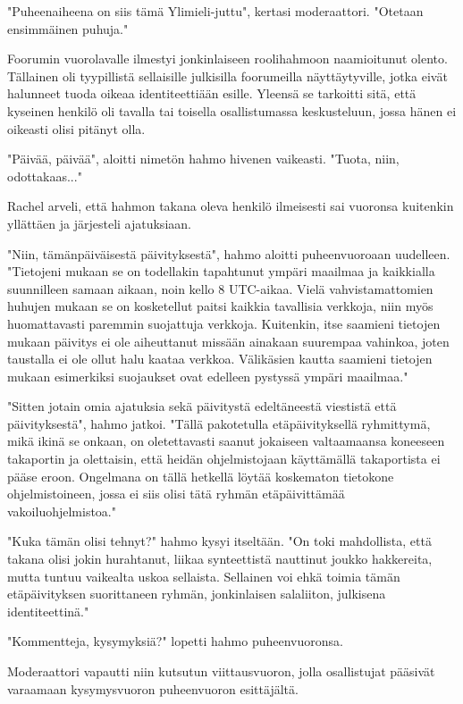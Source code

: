 "Puheenaiheena on siis tämä Ylimieli-juttu", kertasi moderaattori. "Otetaan ensimmäinen puhuja."


Foorumin vuorolavalle ilmestyi jonkinlaiseen roolihahmoon naamioitunut olento. Tällainen oli tyypillistä sellaisille julkisilla foorumeilla näyttäytyville, jotka eivät halunneet tuoda oikeaa identiteettiään esille. Yleensä se tarkoitti sitä, että kyseinen henkilö oli tavalla tai toisella osallistumassa keskusteluun, jossa hänen ei oikeasti olisi pitänyt olla.


"Päivää, päivää", aloitti nimetön hahmo hivenen vaikeasti. "Tuota, niin, odottakaas..."


Rachel arveli, että hahmon takana oleva henkilö ilmeisesti sai vuoronsa kuitenkin yllättäen ja järjesteli ajatuksiaan.


"Niin, tämänpäiväisestä päivityksestä", hahmo aloitti puheenvuoroaan uudelleen. "Tietojeni mukaan se on todellakin tapahtunut ympäri maailmaa ja kaikkialla suunnilleen samaan aikaan, noin kello 8 UTC-aikaa. Vielä vahvistamattomien huhujen mukaan se on kosketellut paitsi kaikkia tavallisia verkkoja, niin myös huomattavasti paremmin suojattuja verkkoja. Kuitenkin, itse saamieni tietojen mukaan päivitys ei ole aiheuttanut missään ainakaan suurempaa vahinkoa, joten taustalla ei ole ollut halu kaataa verkkoa. Välikäsien kautta saamieni tietojen mukaan esimerkiksi suojaukset ovat edelleen pystyssä ympäri maailmaa."


"Sitten jotain omia ajatuksia sekä päivitystä edeltäneestä viestistä että päivityksestä", hahmo jatkoi. "Tällä pakotetulla etäpäivityksellä ryhmittymä, mikä ikinä se onkaan, on oletettavasti saanut jokaiseen valtaamaansa koneeseen takaportin ja olettaisin, että heidän ohjelmistojaan käyttämällä takaportista ei pääse eroon. Ongelmana on tällä hetkellä löytää koskematon tietokone ohjelmistoineen, jossa ei siis olisi tätä ryhmän etäpäivittämää vakoiluohjelmistoa."


"Kuka tämän olisi tehnyt?" hahmo kysyi itseltään. "On toki mahdollista, että takana olisi jokin hurahtanut, liikaa synteettistä nauttinut joukko hakkereita, mutta tuntuu vaikealta uskoa sellaista. Sellainen voi ehkä toimia tämän etäpäivityksen suorittaneen ryhmän, jonkinlaisen salaliiton, julkisena identiteettinä."


"Kommentteja, kysymyksiä?" lopetti hahmo puheenvuoronsa.


Moderaattori vapautti niin kutsutun viittausvuoron, jolla osallistujat pääsivät varaamaan kysymysvuoron puheenvuoron esittäjältä.



